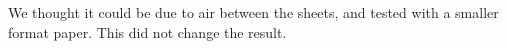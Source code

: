 \documentclass[preview]{standalone}
\begin{document}
\begin{center}
We thought it could be due to air between the sheets, and tested with a smaller format paper. This did not change the result.
\end{center}
\end{document}
